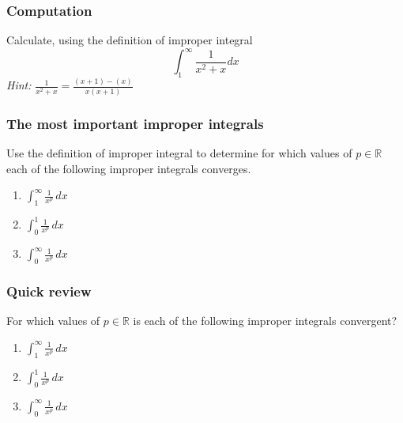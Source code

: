 \documentclass[14pt]{beamer}
\begin{document}
\begin{frame}[t]
	\frametitle{Computation}

	Calculate, using the definition of improper integral
	\[
		\int_{1}^{\infty}\frac{1}{x^{2}+x}dx
	\]
	\emph{Hint:} $\displaystyle \frac{1}{x^{2}+x}= \frac{(x+1) - (x)}{x(x+1)}$
\end{frame}

\begin{frame}[t]
	\frametitle{The most important improper integrals}

	Use the definition of improper integral to determine for which values of
	$\displaystyle p \in \mathbb{R}$ each of the following improper integrals
	converges.

	\begin{enumerate}
		\item $\displaystyle \int_{1}^{\infty}\frac{1}{x^{p}}\, dx$
			\vfill

		\item $\displaystyle \int_{0}^{1}\frac{1}{x^{p}}\, dx$
			\vfill

		\item $\displaystyle \int_{0}^{\infty}\frac{1}{x^{p}}\, dx$
			\vfill
	\end{enumerate}
\end{frame}

\begin{frame}[t]
	\frametitle{Quick review}

	For which values of $\displaystyle p \in \mathbb{R}$ is each of the following
	improper integrals convergent?

	\begin{enumerate}
		\item $\displaystyle \int_{1}^{\infty}\frac{1}{x^{p}}\, dx$

			\vfill

		\item $\displaystyle \int_{0}^{1}\frac{1}{x^{p}}\, dx$

			\vfill

		\item $\displaystyle \int_{0}^{\infty}\frac{1}{x^{p}}\, dx$
	\end{enumerate}
\end{frame}
\end{document}
